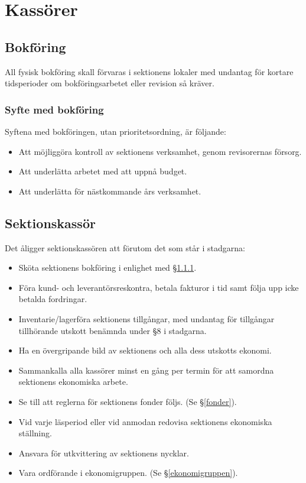 \documentclass{datateknologsektionen-document}
\begin{document}
\section{Kassörer}

\subsection{Bokföring}
All fysisk bokföring skall förvaras i sektionens lokaler med undantag för kortare tidsperioder om bokföringsarbetet eller revision så kräver.
\subsubsection{Syfte med bokföring}
\label{bokforingssyfte}
Syftena med bokföringen, utan prioritetsordning, är följande:
\begin{itemize}
  \item Att möjliggöra kontroll av sektionens verksamhet, genom revisorernas försorg.
  \item Att underlätta arbetet med att uppnå budget.
  \item Att underlätta för nästkommande års verksamhet.
\end{itemize}

\subsection{Sektionskassör}
\label{sektionskassor}
Det åligger sektionskassören att förutom det som står i stadgarna:
\begin{itemize}
  \item Sköta sektionens bokföring i enlighet med \S \ref{bokforingssyfte}.
  \item Föra kund- och leverantörsreskontra, betala fakturor i tid samt följa upp icke betalda fordringar.
  \item Inventarie/lagerföra sektionens tillgångar, med undantag för tillgångar tillhörande utskott benämnda under \S8 i stadgarna.
  \item Ha en övergripande bild av sektionens och alla dess utskotts ekonomi.
  \item Sammankalla alla kassörer minst en gång per termin för att samordna sektionens ekonomiska arbete.
  \item Se till att reglerna för sektionens fonder följs. (Se \S \ref{fonder}).
  \item Vid varje läsperiod eller vid anmodan redovisa sektionens ekonomiska ställning.
  \item Ansvara för utkvittering av sektionens nycklar.
  \item Vara ordförande i ekonomigruppen. (Se \S \ref{ekonomigruppen}).
\end{itemize}
\end{document}

